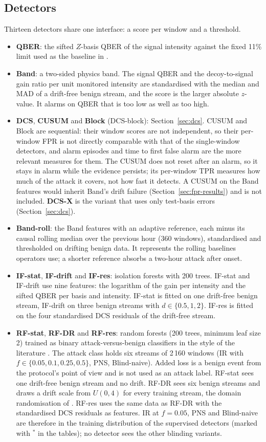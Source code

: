 \subsection{Detectors}
Thirteen detectors share one interface: a score per window and a threshold.
\begin{itemize}
\item \textbf{QBER}: the sifted $Z$-basis QBER of the signal intensity against the fixed 11\% limit used as the baseline in \cite{isha2026}.
\item \textbf{Band}: a two-sided physics band. The signal QBER and the decoy-to-signal gain ratio per unit monitored intensity are standardised with the median and MAD of a drift-free benign stream, and the score is the larger absolute $z$-value. It alarms on QBER that is too low as well as too high.
\item \textbf{DCS}, \textbf{CUSUM} and \textbf{Block} (DCS-block): Section~\ref{sec:dcs}. CUSUM and Block are sequential: their window scores are not independent, so their per-window FPR is not directly comparable with that of the single-window detectors, and alarm episodes and time to first false alarm are the more relevant measures for them. The CUSUM does not reset after an alarm, so it stays in alarm while the evidence persists; its per-window TPR measures how much of the attack it covers, not how fast it detects. A CUSUM on the Band features would inherit Band's drift failure (Section~\ref{sec:fpr-results}) and is not included. \textbf{DCS-X} is the variant that uses only test-basis errors (Section~\ref{sec:dcs}).
\item \textbf{Band-roll}: the Band features with an adaptive reference, each minus its causal rolling median over the previous hour (360 windows), standardised and thresholded on drifting benign data. It represents the rolling baselines operators use; a shorter reference absorbs a two-hour attack after onset.
\item \textbf{IF-stat}, \textbf{IF-drift} and \textbf{IF-res}: isolation forests \cite{liu2008} with 200 trees. IF-stat and IF-drift use nine features: the logarithm of the gain per intensity and the sifted QBER per basis and intensity. IF-stat is fitted on one drift-free benign stream, IF-drift on three benign streams with $d\in\{0.5,1,2\}$. IF-res is fitted on the four standardised DCS residuals of the drift-free stream.
\item \textbf{RF-stat}, \textbf{RF-DR} and \textbf{RF-res}: random forests \cite{breiman2001} (200 trees, minimum leaf size 2) trained as binary attack-versus-benign classifiers in the style of the literature \cite{isha2026,alkuwari2026}. The attack class holds six streams of 2\,160 windows (IR with $f\in\{0.05,0.1,0.25,0.5\}$, PNS, Blind-naive). Added loss is a benign event from the protocol's point of view and is not used as an attack label. RF-stat sees one drift-free benign stream and no drift. RF-DR sees six benign streams and draws a drift scale from $U(0,4)$ for every training stream, the domain randomisation of \cite{mohamed2026}. RF-res uses the same data as RF-DR with the standardised DCS residuals as features. IR at $f=0.05$, PNS and Blind-naive are therefore in the training distribution of the supervised detectors (marked with $^*$ in the tables); no detector sees the other blinding variants.

\end{itemize}
